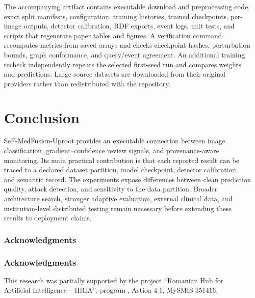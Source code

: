 \documentclass{svproc}
\begin{document}
The accompanying artifact contains executable download and preprocessing code, exact split manifests, configuration, training histories, trained checkpoints, per-image outputs, detector calibration, RDF exports, event logs, unit tests, and scripts that regenerate paper tables and figures. A verification command recomputes metrics from saved arrays and checks checkpoint hashes, perturbation bounds, graph conformance, and query/event agreement. An additional training recheck independently repeats the selected first-seed run and compares weights and predictions. Large source datasets are downloaded from their original providers rather than redistributed with the repository.

\section{Conclusion}
SeF-MedFusion-Uproot provides an executable connection between image classification, gradient--confidence review signals, and provenance-aware monitoring. Its main practical contribution is that each reported result can be traced to a declared dataset partition, model checkpoint, detector calibration, and semantic record. The experiments expose differences between clean prediction quality, attack detection, and sensitivity to the data partition. Broader architecture search, stronger adaptive evaluation, external clinical data, and institution-level distributed testing remain necessary before extending these results to deployment claims.

\ifdefined\AINATemplate
\subsubsection*{Acknowledgments}
\else
\begin{credits}
\subsubsection{Acknowledgments}
\fi
This research was partially supported by the project ``Romanian Hub for Artificial Intelligence -- HRIA'', program , Action 4.1, MySMIS 351416.
\ifdefined\AINATemplate\else\end{credits}\fi

\ifdefined\AINATemplate

\else

\fi

\end{document}

